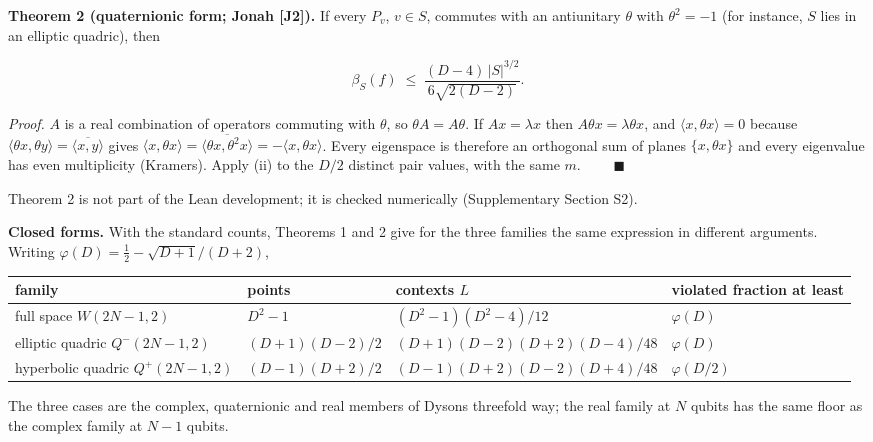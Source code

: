 \documentclass[11pt,a4paper]{article}
\begin{document}
\textbf{Theorem 2 (quaternionic form; Jonah {[}J2{]}).} If every \(P_v\), \(v \in S\), commutes with an
antiunitary \(\theta\) with \(\theta^2 = -1\) (for instance, \(S\) lies in an elliptic quadric), then

\[\beta_S(f) \;\le\; \frac{(D-4)\,|S|^{3/2}}{6\sqrt{2(D-2)}} .\]

\emph{Proof.} \(A\) is a real combination of operators commuting with \(\theta\), so \(\theta A = A \theta\). If
\(A x = \lambda x\) then \(A\theta x = \lambda \theta x\), and \(\langle x, \theta x\rangle = 0\) because
\(\langle \theta x, \theta y\rangle = \overline{\langle x, y \rangle}\) gives
\(\langle x, \theta x\rangle = \overline{\langle \theta x, \theta^2 x\rangle} = -\langle x, \theta x\rangle\).
Every eigenspace is therefore an orthogonal sum of planes \(\{x, \theta x\}\) and every eigenvalue has even
multiplicity (Kramers). Apply (ii) to the \(D/2\) distinct pair values, with the same \(m\).
\(\qquad\blacksquare\)

Theorem 2 is not part of the Lean development; it is checked numerically (Supplementary Section S2).

\textbf{Closed forms.} With the standard counts, Theorems 1 and 2 give for the three families the same
expression in different arguments. Writing \(\varphi(D) = \tfrac12 - \sqrt{D+1}/(D+2)\),

{\def\LTcaptype{none} %
{\small
\begin{longtable}[]{@{}>{\raggedright\arraybackslash}p{}>{\raggedright\arraybackslash}p{}>{\raggedright\arraybackslash}p{}>{\raggedright\arraybackslash}p{}@{}}
\toprule\noalign{}
family & points & contexts \(L\) & violated fraction at least \\
\midrule\noalign{}
\endhead
\bottomrule\noalign{}
\endlastfoot
full space \(W(2N-1,2)\) & \(D^2-1\) & \((D^2-1)(D^2-4)/12\) & \(\varphi(D)\) \\
elliptic quadric \(Q^-(2N-1,2)\) & \((D+1)(D-2)/2\) & \((D+1)(D-2)(D+2)(D-4)/48\) & \(\varphi(D)\) \\
hyperbolic quadric \(Q^+(2N-1,2)\) & \((D-1)(D+2)/2\) & \((D-1)(D+2)(D-2)(D+4)/48\) & \(\varphi(D/2)\) \\
\end{longtable}
}
}

The three cases are the complex, quaternionic and real members of Dyson\textquotesingle s threefold way; the real
family at \(N\) qubits has the same floor as the complex family at \(N-1\) qubits.
\end{document}
